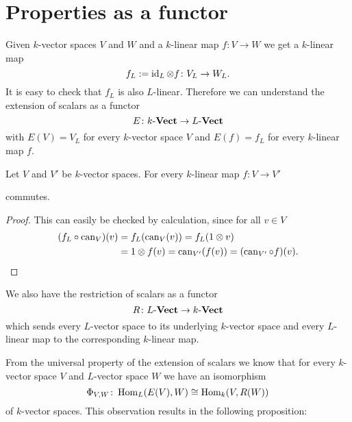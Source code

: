 \section{Properties as a functor}


Given $k$-vector spaces $V$ and $W$ and a $k$-linear map $f \colon V \to W$ we get a $k$-linear map
\[
 f_L := \operatorname{id}_L \otimes f \colon V_L \to W_L.
\]
It is easy to check that $f_L$ is also $L$-linear. Therefore we can understand the extension of scalars as a functor
\[
 E \colon k\text{-}\mathbf{Vect} \to L\text{-}\mathbf{Vect}
\]
with $E(V) = V_L$ for every $k$-vector space $V$ and $E(f) = f_L$ for every $k$-linear map $f$. 

\begin{lem}
 Let $V$ and $V'$ be $k$-vector spaces. For every $k$-linear map $f : V \to V'$
 \begin{center}
 \end{center}
 commutes.
\end{lem}
\begin{proof}
 This can easily be checked by calculation, since for all $v \in V$
 \begin{align*}
  (f_L \circ \operatorname{can}_V)(v)
  &= f_L(\operatorname{can}_V(v))
  = f_L(1 \otimes v) \\
  &= 1 \otimes f(v)
  = \operatorname{can}_{V'}(f(v))
  = (\operatorname{can}_{V'} \circ f)(v).
 \end{align*}
\end{proof}


We also have the restriction of scalars as a functor
\[
 R \colon L\text{-}\mathbf{Vect} \to k\text{-}\mathbf{Vect}
\]
which sends every $L$-vector space to its underlying $k$-vector space and every $L$-linear map to the corresponding $k$-linear map.
 
From the universal property of the extension of scalars we know that for every $k$-vector space $V$ and $L$-vector space $W$ we have an isomorphism
\[
 \Phi_{V,W} \colon \operatorname{Hom}_L(E(V),W) \cong \operatorname{Hom}_k(V,R(W))
\]
of $k$-vector spaces. This observation results in the following proposition:
 
